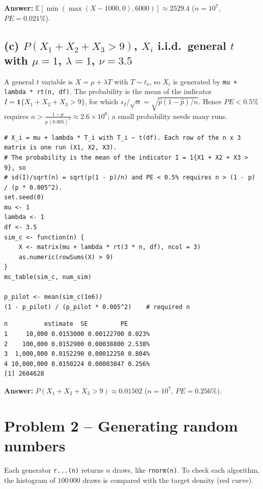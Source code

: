 \documentclass[11pt,a4paper]{article}
\begin{document}
\noindent\textbf{Answer:} $\mathbb{E}[\min(\max(X - 1000, 0), 6000)] \approx 2529.4$ ($n = 10^7$, $PE = 0.021\%$).

\subsection*{(c) $P(X_1 + X_2 + X_3 > 9)$, $X_i$ i.i.d.\ general $t$ with $\mu = 1$, $\lambda = 1$, $\nu = 3.5$}

A general $t$ variable is $X = \mu + \lambda T$ with $T \sim t_\nu$, so $X_i$ is generated by
\texttt{mu + lambda * rt(n, df)}. The probability is the mean of the indicator
$I = \mathbf 1\{X_1 + X_2 + X_3 > 9\}$, for which $s_I/\sqrt n = \sqrt{\hat p(1-\hat p)/n}$. Hence
$PE < 0.5\%$ requires $n > \frac{1-p}{p\,(0.005)^2} \approx 2.6\times 10^6$; a small probability needs many runs.

\begin{lstlisting}
# X_i = mu + lambda * T_i with T_i ~ t(df). Each row of the n x 3 matrix is one run (X1, X2, X3).
# The probability is the mean of the indicator I = 1{X1 + X2 + X3 > 9}, so
# sd(I)/sqrt(n) = sqrt(p(1 - p)/n) and PE < 0.5% requires n > (1 - p) / (p * 0.005^2).
set.seed(0)
mu <- 1
lambda <- 1
df <- 3.5
sim_c <- function(n) {
    X <- matrix(mu + lambda * rt(3 * n, df), ncol = 3)
    as.numeric(rowSums(X) > 9)
}
mc_table(sim_c, num_sim)

p_pilot <- mean(sim_c(1e6))
(1 - p_pilot) / (p_pilot * 0.005^2)    # required n
\end{lstlisting}
\begin{lstlisting}[style=rout]
  n          estimate  SE         PE    
1     10,000 0.0153000 0.00122700 8.023%
2    100,000 0.0152900 0.00038800 2.538%
3  1,000,000 0.0152290 0.00012250 0.804%
4 10,000,000 0.0150224 0.00003847 0.256%
[1] 2604628
\end{lstlisting}

\noindent\textbf{Answer:} $P(X_1 + X_2 + X_3 > 9) \approx 0.01502$ ($n = 10^7$, $PE = 0.256\%$).

\section*{Problem 2 -- Generating random numbers}

Each generator \texttt{r...(n)} returns $n$ draws, like \texttt{rnorm(n)}. To check each algorithm, the histogram
of $100\,000$ draws is compared with the target density (red curve).
\end{document}
